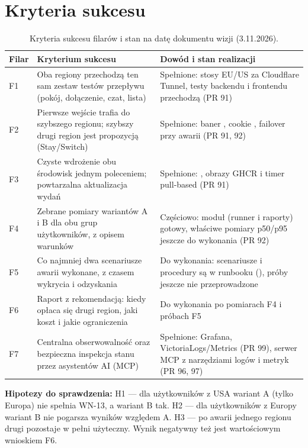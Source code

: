 \section{Kryteria sukcesu}
\begin{table}[H]
\centering\small
\begin{tabularx}{\textwidth}{@{}lYY@{}}
\toprule
\textbf{Filar} & \textbf{Kryterium sukcesu} & \textbf{Dowód i stan realizacji} \\
\midrule
F1 & Oba regiony przechodzą ten sam zestaw testów przepływu (pokój, dołączenie, czat, lista) & Spełnione: stosy EU/US za Cloudflare Tunnel, testy backendu i frontendu przechodzą (PR 91) \\
F2 & Pierwsze wejście trafia do szybszego regionu; szybszy drugi region jest propozycją (Stay/Switch) & Spełnione: baner , cookie , failover przy awarii (PR 91, 92) \\
F3 & Czyste wdrożenie obu środowisk jednym poleceniem; powtarzalna aktualizacja wydań & Spełnione: , obrazy GHCR i timer pull-based  (PR 91) \\
F4 & Zebrane pomiary wariantów A i B dla obu grup użytkowników, z opisem warunków & Częściowo: moduł  (runner i raporty) gotowy, właściwe pomiary p50/p95 jeszcze do wykonania (PR 92) \\
F5 & Co najmniej dwa scenariusze awarii wykonane, z czasem wykrycia i odzyskania & Do wykonania: scenariusze i procedury są w runbooku (), próby jeszcze nie przeprowadzone \\
F6 & Raport z rekomendacją: kiedy opłaca się drugi region, jaki koszt i jakie ograniczenia & Do wykonania po pomiarach F4 i próbach F5 \\
F7 & Centralna obserwowalność oraz bezpieczna inspekcja stanu przez asystentów AI (MCP) & Spełnione: Grafana, VictoriaLogs/Metrics (PR 99), serwer MCP z narzędziami logów i metryk (PR 96, 97) \\
\bottomrule
\end{tabularx}
\caption{Kryteria sukcesu filarów i stan na datę dokumentu wizji (3.11.2026).}
\end{table}

\textbf{Hipotezy do sprawdzenia:} H1 --- dla użytkowników z USA wariant A (tylko
Europa) nie spełnia WN-13, a wariant B tak. H2 --- dla użytkowników z Europy wariant
B nie pogarsza wyników względem A. H3 --- po awarii jednego regionu drugi pozostaje w
pełni użyteczny. Wynik negatywny też jest wartościowym wnioskiem F6.

